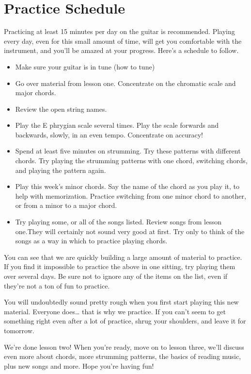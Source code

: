 \section{Practice Schedule}
Practicing at least 15 minutes per day on the guitar is recommended. Playing
every day, even for this small amount of time, will get you comfortable with
the instrument, and you'll be amazed at your progress. Here's a schedule to
follow.
%
\begin{itemize}
\item Make sure your guitar is in tune (how to tune)
\item Go over material from lesson one. Concentrate on the chromatic scale and
      major chords.
\item Review the open string names.
\item Play the E phrygian scale several times. Play the scale forwards and
      backwards, slowly, in an even tempo. Concentrate on accuracy!
\item Spend at least five minutes on strumming. Try these patterns with
      different chords. Try playing the strumming patterns with one chord, switching
      chords, and playing the pattern again.
\item Play this week's minor chords. Say the name of the chord as you play it,
      to help with memorization. Practice switching from one minor chord to another,
      or from a minor to a major chord.
\item Try playing some, or all of the songs listed. Review songs from lesson
      one.They will certainly not sound very good at first. Try only to think of the
      songs as a way in which to practice playing chords.
\end{itemize}
%
You can see that we are quickly building a large amount of material to
practice. If you find it impossible to practice the above in one sitting, try
playing them over several days. Be sure not to ignore any of the items on the
list, even if they're not a ton of fun to practice.

You will undoubtedly sound pretty rough when you first start playing this new
material. Everyone does\ldots{} that is why we practice. If you can't seem to get
something right even after a lot of practice, shrug your shoulders, and leave
it for tomorrow.

We're done lesson two! When you're ready, move on to lesson three, we'll
discuss even more about chords, more strumming patterns, the basics of reading
music, plus new songs and more. Hope you're having fun!

